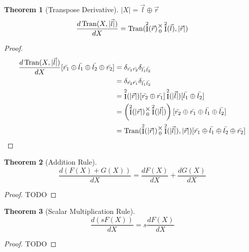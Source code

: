 \documentclass[12pt]{article}
\theoremstyle{definition}
\newtheorem{theorem}{Theorem}[section]
\theoremstyle{case}
\theoremstyle{ppart}
\DeclareMathOperator{\Ident}{I}
\DeclareMathOperator{\Tran}{Tran}
\newcommand{\mmult}[1]{\text{\raisebox{1ex}{$\underset{#1}{\times}$}}}
\begin{document}
\begin{theorem}[Transpose Derivative]
$|X| = \vec{l} \oplus \vec{r}$
\[
 \frac{d\Tran(X, |\vec{l}|)}{dX} =
 \Tran(\Ident^2(\vec{r}) \mmult{0} \Ident^2(\vec{l}), |\vec{r}|)
\]
\end{theorem}
\begin{proof}
\begin{align*}
 \frac{d\Tran(X, |\vec{l}|)}{dX}
 [\bar{r_1} \oplus \bar{l_1} \oplus \bar{l_2} \oplus \bar{r_2}]
 &= \delta_{\bar{r_1}\bar{r_2}} \delta_{\bar{l_1}\bar{l_2}} \\
 &= \delta_{\bar{r_2}\bar{r_1}} \delta_{\bar{l_1}\bar{l_2}} \\
 &=
  \Ident^2(|\vec{r}|)[\bar{r_2}\oplus\bar{r_1}]
  \Ident^2(|\vec{l}|)[\bar{l_1}\oplus\bar{l_2}] \\
 &=
 	\left(
		\Ident^2(|\vec{r}|)
		\mmult{0}
		\Ident^2(|\vec{l}|)
	\right)
	[\bar{r_2}\oplus\bar{r_1}\oplus\bar{l_1}\oplus\bar{l_2}] \\
 &=
  \Tran(
    \Ident^2(|\vec{r}|)
	  \mmult{0}
    \Ident^2(|\vec{l}|)
  , |\vec{r}|) 
 [\bar{r_1} \oplus \bar{l_1} \oplus \bar{l_2} \oplus \bar{r_2}]
\end{align*}
\end{proof}

\begin{theorem}[Addition Rule]
\[ \frac{d(F(X) + G(X))}{dX} = \frac{dF(X)}{dX} + \frac{dG(X)}{dX} \]
\end{theorem}
\begin{proof}
TODO
\end{proof}

\begin{theorem}[Scalar Multiplication Rule]
\[ \frac{d(sF(X))}{dX} = s\frac{dF(X)}{dX} \]
\end{theorem}
\begin{proof}
TODO
\end{proof}
\end{document}
